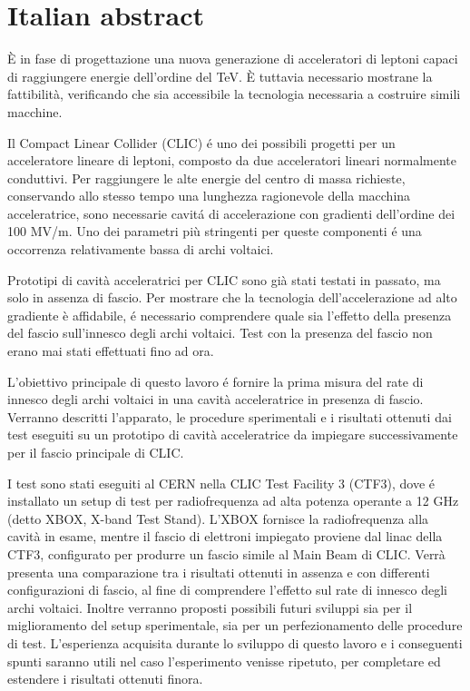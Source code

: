 \chapter*{Italian abstract}

\`E in fase di progettazione una nuova generazione di acceleratori di leptoni capaci di raggiungere energie dell'ordine del TeV. \`E tuttavia necessario mostrane la fattibilit\`a, verificando che sia accessibile la tecnologia necessaria a costruire simili macchine.

Il Compact Linear Collider (CLIC) é uno dei possibili progetti per un acceleratore lineare di leptoni, composto da due acceleratori lineari normalmente conduttivi. Per raggiungere le alte energie del centro di massa richieste, conservando allo stesso tempo una lunghezza ragionevole della macchina acceleratrice, sono necessarie cavitá di accelerazione con gradienti dell'ordine dei 100 MV/m. Uno dei parametri pi\`u stringenti per queste componenti é una occorrenza relativamente bassa di archi voltaici.

Prototipi di cavit\`a acceleratrici per CLIC sono gi\`a stati testati in passato, ma solo in assenza di fascio. Per mostrare che la tecnologia dell'accelerazione ad alto gradiente \`e affidabile, é necessario comprendere quale sia l'effetto della presenza del fascio sull'innesco degli archi voltaici. Test con la presenza del fascio non erano mai stati effettuati fino ad ora.

L'obiettivo principale di questo lavoro é fornire la prima misura del rate di innesco degli archi voltaici in una cavit\`a acceleratrice in presenza di fascio. Verranno descritti l'apparato, le procedure sperimentali e i risultati ottenuti dai test eseguiti su un prototipo di cavit\`a acceleratrice da impiegare successivamente per il fascio principale di CLIC.

I test sono stati eseguiti al CERN nella CLIC Test Facility 3 (CTF3), dove é installato un setup di test per radiofrequenza ad alta potenza operante a 12 GHz (detto XBOX, X-band Test Stand). L'XBOX fornisce la radiofrequenza alla cavit\`a in esame, mentre il fascio di elettroni impiegato proviene dal linac della CTF3, configurato per produrre un fascio simile al Main Beam di CLIC. Verr\`a presenta una comparazione tra i risultati ottenuti in assenza e con differenti configurazioni di fascio, al fine di comprendere l'effetto sul rate di innesco degli archi voltaici. Inoltre verranno proposti possibili futuri sviluppi sia per il miglioramento del setup sperimentale, sia per un perfezionamento delle procedure di test. L'esperienza acquisita durante lo sviluppo di questo lavoro e i conseguenti spunti saranno utili nel caso l'esperimento venisse ripetuto, per completare ed estendere i risultati ottenuti finora.